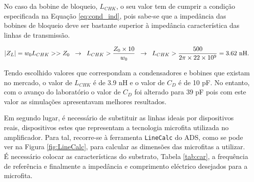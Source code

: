 \documentclass[11pt]{article}
\numberwithin{equation}{section}
\begin{document}
\vspace{1mm}
No caso da bobine de bloqueio, $L_{CHK}$, o seu valor tem de cumprir a condição especificada na Equação \ref{eq:cond_ind}, pois sabe-se que a impedância das bobines de bloqueio deve ser bastante superior à impedância característica das linhas de transmissão.  

\vspace{-3mm}
\begin{equation}
\lvert Z_L \rvert = w_{0} L_{CHK} >> Z_0 \hspace{2mm} \rightarrow \hspace{2mm} L_{CHK} > \frac{Z_0 \times 10}{w_{0}} \hspace{2mm} \rightarrow \hspace{2mm} L_{CHK} > \frac{500}{2 \pi \times 22 \times 10^{9}} = 3.62~\text{nH}.
\label{eq:cond_ind}
\end{equation}

\vspace{1mm}
Tendo escolhido valores que correspondam a condensadores e bobines que existam no mercado, o valor de $L_{CHK}$ é de 3.9 nH e o valor de $C_{D}$ é de 10 pF. No entanto, com o avanço do laboratório o valor de $C_{D}$ foi alterado para 39 pF pois com este valor as simulações apresentavam melhores resultados.

Em segundo lugar, é necessário de substituir as linhas ideais por dispositivos reais, dispositivos estes que representam a tecnologia microfita utilizada no amplificador. Para tal, recorre-se à ferramenta \texttt{LineCalc} do ADS, como se pode ver na Figura \ref{fig:LineCalc}, para calcular as dimensões das microfitas a utilizar. É necessário colocar as características do substrato, Tabela \ref{tab:car}, a frequência de referência e finalmente a impedância e comprimento eléctrico desejados para a microfita.
\end{document}

